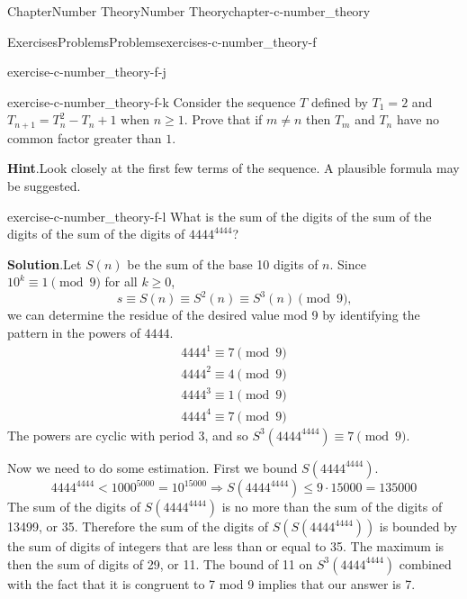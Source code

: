 \documentclass[oneside,10pt,]{book}
\newcommand{\blocktitlefont}{\relax}
\numberwithin{equation}{section}
\newcommand{\lt}{<}
\begin{document}
\begin{chapterptx}{Chapter}{Number Theory}{}{Number Theory}{}{}{chapter-c-number_theory}
\begin{exercises-section}{Exercises}{Problems}{}{Problems}{}{}{exercises-c-number_theory-f}
\begin{divisionexercise}{8}{}{}{exercise-c-number_theory-f-j}
\end{divisionexercise}%
\begin{divisionexercise}{9}{}{}{exercise-c-number_theory-f-k}%
Consider the sequence \(T\) defined by \(T_1=2\) and \(T_{n+1}=T_n^2-T_n+1\) when \(n \geq 1\). Prove that if \(m \neq n\) then \(T_m\) and \(T_n\) have no common factor greater than \(1\).%
\par\smallskip%
\noindent\textbf{\blocktitlefont Hint}.\hypertarget{hint-c-number_theory-f-k-b}{}\quad{}Look closely at the first few terms of the sequence.  A plausible formula may be suggested.%
\end{divisionexercise}%
\begin{divisionexercise}{10}{}{}{exercise-c-number_theory-f-l}%
What is the sum of the digits of the sum of the digits of the sum of the digits of \(4444^{4444}\)?%
\par\smallskip%
\noindent\textbf{\blocktitlefont Solution}.\hypertarget{solution-c-number_theory-f-l-b}{}\quad{}Let \(S(n)\) be the sum of the base 10 digits of \(n\).  Since  \(10^k \equiv 1 \pmod{9}\) for all \(k \geq 0\),%
\begin{equation*}
s \equiv S(n) \equiv S^{2}(n) \equiv S^{3}(n) \pmod{9}\text{,}
\end{equation*}
we can determine the residue of the desired value mod 9 by identifying the pattern in the powers of \(4444\).%
\begin{equation*}
\begin{split}
4444^1 \equiv 7 \pmod{9}\\
4444^2 \equiv 4 \pmod{9}\\
4444^3 \equiv 1 \pmod{9}\\
4444^4 \equiv 7 \pmod{9}
\end{split}
\end{equation*}
The powers are cyclic with period 3, and so \(S^3(4444^{4444}) \equiv 7 \pmod{9}\).%
\par
Now we need to do some estimation.  First we bound  \(S(4444^{4444})\).%
\begin{equation*}
4444^{4444} \lt 1000^{5000} = 10^{15000} \Rightarrow S(4444^{4444}) \leq 9\cdot 15000 = 135000
\end{equation*}
The sum of the digits of \(S(4444^{4444})\) is no more than the sum of the digits of 13499, or 35. Therefore the sum of the digits of  \(S(S(4444^{4444}))\) is bounded by the sum of digits of integers that are less than or equal to 35.  The maximum is then the sum of digits of 29, or 11.   The bound of 11 on \(S^3(4444^{4444})\) combined with the fact that it is congruent to 7 mod 9 implies that our answer is 7.%

\end{divisionexercise}
\end{exercises-section}
\end{chapterptx}
\end{document}
